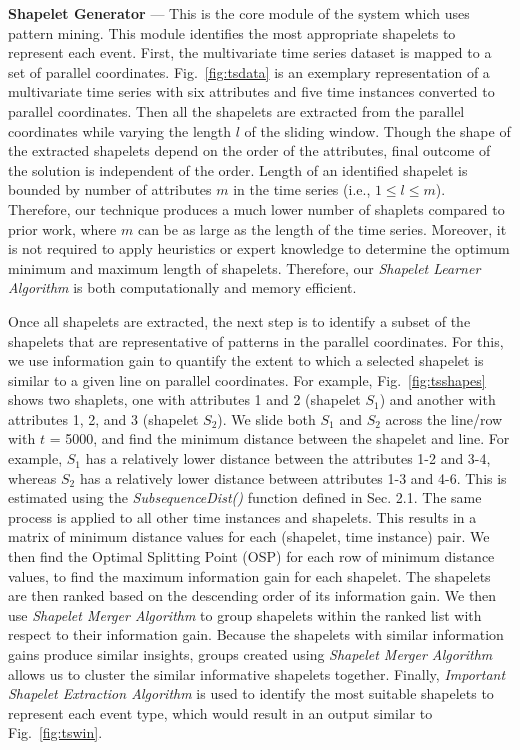 \documentclass[conference]{IEEEtran}  %
\begin{document}
\textbf{Shapelet Generator}	--- This is the core module of the system which uses pattern mining. This module identifies the most appropriate shapelets to represent each event. First, the multivariate time series dataset is mapped to a set of parallel coordinates. Fig.~\ref{fig:tsdata} is an exemplary representation of a multivariate time series with six attributes and five time instances converted to parallel coordinates. Then all the shapelets are extracted from the parallel coordinates while varying the length $l$ of the sliding window. Though the shape of the extracted shapelets depend on the order of the attributes, final outcome of the solution is independent of the order. Length of an identified shapelet is bounded by number of attributes $m$ in the time series (i.e., $1 \leq l \leq m$). Therefore, our technique produces a much lower number of shaplets compared to prior work, where $m$ can be as large as the length of the time series. Moreover, it is not required to apply heuristics or expert knowledge to determine the optimum minimum and maximum length of shapelets. Therefore, our \textit{Shapelet Learner Algorithm} is both computationally and memory efficient.

Once all shapelets are extracted, the next step is to identify a subset of the shapelets that are representative of patterns in the parallel coordinates. For this, we use information gain to quantify the extent to which a selected shapelet is similar to a given line on parallel coordinates. For example, Fig.~\ref{fig:tsshapes} shows two shaplets, one with attributes 1 and 2 (shapelet $S_1$) and another with attributes 1, 2, and 3 (shapelet $S_2$). We slide both $S_1$ and $S_2$ across the line/row with $t$ = 5000, and find the minimum distance between the shapelet and line. For example, $S_1$ has a relatively lower distance between the attributes 1-2 and 3-4, whereas $S_2$ has a relatively lower distance between attributes 1-3 and 4-6. This is estimated using the \textit{SubsequenceDist()} function defined in Sec. 2.1. The same process is applied to all other time instances and shapelets. This results in a matrix of minimum distance values for each (shapelet, time instance) pair. We then find the Optimal Splitting Point (OSP) \cite{IEEEexample:TimeSeriesShapelets} for each row of minimum distance values, to find the maximum information gain for each shapelet. The shapelets are then ranked based on the descending order of its information gain. We then use \textit{Shapelet Merger Algorithm} to group shapelets within the ranked list with respect to their information gain. Because the shapelets with similar information gains produce similar insights, groups created using \textit{Shapelet Merger Algorithm} allows us to cluster the similar informative shapelets together. Finally, \textit{Important Shapelet Extraction Algorithm} is used to identify the most suitable shapelets to represent each event type, which would result in an output similar to Fig.~\ref{fig:tswin}.
\end{document}
